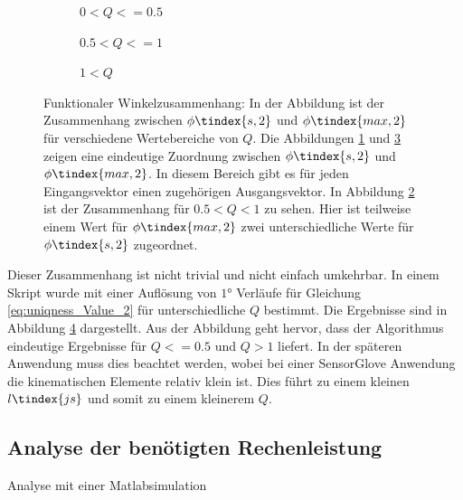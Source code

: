 	
\begin{figure}
	\begin{subfigure}{0.5\textwidth}
		\centering
		\caption{$0<Q<=0.5$}
		\label{fig:0_05_Unique}
	\end{subfigure}
	\hspace{0.25cm}
	\begin{subfigure}{0.5\textwidth}
		\centering
		\caption{$0.5<Q<=1$}
		\label{fig:05_10_unique}
	\end{subfigure}
	\begin{subfigure}{0.5\textwidth}
		\centering
		\caption{$1<Q$}
		\label{fig:bigger1_unique}
	\end{subfigure}
	\caption{ Funktionaler Winkelzusammenhang: In der Abbildung ist der Zusammenhang zwischen $\phi\tindex{s,2}$ und $\phi\tindex{max,2}$ für verschiedene Wertebereiche von $Q$. Die Abbildungen \ref{fig:0_05_Unique} und \ref{fig:bigger1_unique} zeigen eine eindeutige Zuordnung zwischen $\phi\tindex{s,2}$ und $\phi\tindex{max,2}$. In diesem Bereich gibt es für jeden Eingangsvektor einen zugehörigen Ausgangsvektor. In Abbildung \ref{fig:05_10_unique} ist der Zusammenhang für $0.5 < Q < 1$ zu sehen. Hier ist teilweise einem Wert für $\phi\tindex{max,2}$ zwei unterschiedliche Werte für $\phi\tindex{s,2}$ zugeordnet.}

    
	\label{fig:uniqueness}
\end{figure}

Dieser Zusammenhang ist nicht trivial und nicht einfach umkehrbar. In einem Skript wurde mit einer Auflösung von $1°$ Verläufe für Gleichung \ref{eq:uniqness_Value_2} für unterschiedliche $Q$ bestimmt. Die Ergebnisse sind in Abbildung \ref{fig:uniqueness} dargestellt. Aus der Abbildung geht hervor, dass der Algorithmus eindeutige Ergebnisse für $Q<=0.5$ und $Q>1$ liefert. In der späteren Anwendung muss dies beachtet werden, wobei bei einer SensorGlove Anwendung die kinematischen Elemente relativ klein ist. Dies führt zu einem kleinen $l\tindex{js}$ und somit zu einem kleinerem $Q$. 

\subsection{Analyse der benötigten Rechenleistung}
Analyse mit einer Matlabsimulation

